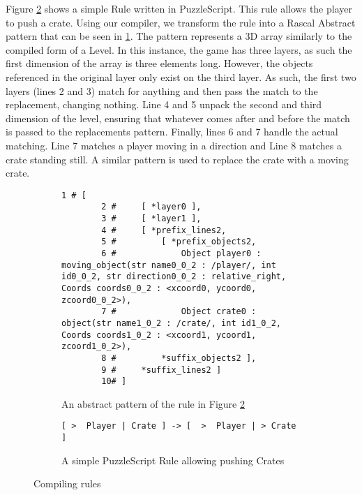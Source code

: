 Figure \ref{fig:Rule Compilation Code} shows a simple Rule written in PuzzleScript. This rule allows the player to push a crate. Using our compiler, we transform the rule into a Rascal Abstract pattern that can be seen in \ref{fig:Rule Compilation Pattern}. The pattern represents a 3D array similarly to the compiled form of a Level. In this instance, the game has three layers, as such the first dimension of the array is three elements long. However, the objects referenced in the original layer only exist on the third layer. As such, the first two layers (lines 2 and 3) match for anything and then pass the match to the replacement, changing nothing. Line 4 and 5 unpack the second and third dimension of the level, ensuring that whatever comes after and before the match is passed to the replacements pattern. Finally, lines 6 and 7 handle the actual matching. Line 7 matches a player moving in a direction and Line 8 matches a crate standing still. A similar pattern is used to replace the crate with a moving crate.

\begin{figure}[!t]
    \begin{subfigure}{1\textwidth}
        \begin{lstlisting}[language=rascal]    
        1 # [ 
        2 #     [ *layer0 ], 
        3 #     [ *layer1 ], 
        4 #     [ *prefix_lines2, 
        5 #         [ *prefix_objects2, 
        6 #             Object player0 : moving_object(str name0_0_2 : /player/, int id0_0_2, str direction0_0_2 : relative_right, Coords coords0_0_2 : <xcoord0, ycoord0, zcoord0_0_2>), 
        7 #             Object crate0 : object(str name1_0_2 : /crate/, int id1_0_2, Coords coords1_0_2 : <xcoord1, ycoord1, zcoord1_0_2>), 
        8 #         *suffix_objects2 ], 
        9 #     *suffix_lines2 ]
        10# ]
        \end{lstlisting}
        \vspace*{-8pt}
        \caption{An abstract pattern of the rule in Figure \ref{fig:Rule Compilation Code}}
        \label{fig:Rule Compilation Pattern}
    \end{subfigure}
    
    \begin{subfigure}{1\textwidth}
        \begin{lstlisting}[language=PuzzleScript]
        [ >  Player | Crate ] -> [  >  Player | > Crate  ]
        \end{lstlisting}
        \vspace*{-8pt}
        \caption{A simple PuzzleScript Rule allowing pushing Crates}
        \label{fig:Rule Compilation Code}
        \vspace*{-8pt}
    \end{subfigure}
    
    \caption{Compiling rules}
    \label{fig:compiling rules}
\end{figure}

